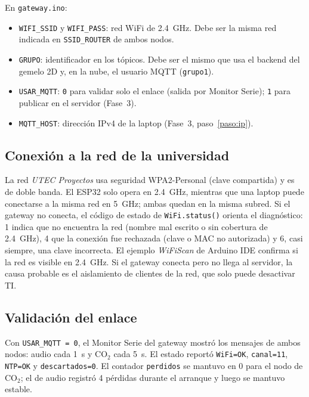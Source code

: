 \documentclass[11pt,a4paper]{article}
\newcommand{\arch}[1]{\texttt{#1}}
\begin{document}
\begin{completar}
En \arch{gateway.ino}:
\begin{itemize}
  \item \texttt{WIFI\_SSID} y \texttt{WIFI\_PASS}: red WiFi de 2.4~GHz. Debe ser la misma
        red indicada en \texttt{SSID\_ROUTER} de ambos nodos.
  \item \texttt{GRUPO}: identificador en los t\'opicos. Debe ser el mismo que usa el backend del
        gemelo 2D y, en la nube, el usuario MQTT (\texttt{grupo1}).
  \item \texttt{USAR\_MQTT}: \texttt{0} para validar solo el enlace (salida por Monitor
        Serie); \texttt{1} para publicar en el servidor (Fase~3).
  \item \texttt{MQTT\_HOST}: direcci\'on IPv4 de la laptop (Fase~3, paso~\ref{paso:ip}).
\end{itemize}
\end{completar}

\subsection{Conexi\'on a la red de la universidad}

La red \emph{UTEC Proyectos} usa seguridad WPA2-Personal (clave compartida) y es de doble banda.
El ESP32 solo opera en 2.4~GHz, mientras que una laptop puede conectarse a la misma red en 5~GHz;
ambas quedan en la misma subred. Si el gateway no conecta, el c\'odigo de estado de
\texttt{WiFi.status()} orienta el diagn\'ostico: 1 indica que no encuentra la red (nombre mal
escrito o sin cobertura de 2.4~GHz), 4 que la conexi\'on fue rechazada (clave o MAC no autorizada)
y 6, casi siempre, una clave incorrecta. El ejemplo \emph{WiFiScan} de Arduino IDE confirma si la
red es visible en 2.4~GHz. Si el gateway conecta pero no llega al servidor, la causa probable es el
aislamiento de clientes de la red, que solo puede desactivar TI.

\subsection{Validaci\'on del enlace}

Con \texttt{USAR\_MQTT = 0}, el Monitor Serie del gateway mostr\'o los mensajes de ambos nodos:
audio cada 1~s y CO$_2$ cada 5~s. El estado report\'o \texttt{WiFi=OK}, \texttt{canal=11},
\texttt{NTP=OK} y \texttt{descartados=0}. El contador \texttt{perdidos} se mantuvo en 0 para
el nodo de CO$_2$; el de audio registr\'o 4 p\'erdidas durante el arranque y luego se mantuvo
estable.
\end{document}
